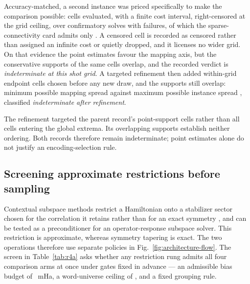 \documentclass[aps,pra,reprint,superscriptaddress,nofootinbib,floatfix,
  showkeys]{revtex4-2}
\begin{document}
Accuracy-matched, a second instance was priced specifically to make the
comparison possible: \cqcRThreeCCells{} cells evaluated, \cqcRThreeCFinite{}
with a finite cost interval, \cqcRThreeCCensored{} right-censored at the grid
ceiling, over \cqcRThreeCSolves{} confirmatory solves with
\cqcRThreeCFailures{} failures, of which the sparse-connectivity card admits
only \cqcRThreeCSCPriced{}.  A censored cell is recorded as censored rather than
assigned an infinite cost or quietly dropped, and it licenses no wider grid.  On
that evidence the point estimates favour the mapping axis, but the conservative
supports of the same cells overlap, and the recorded verdict is
\emph{indeterminate at this shot grid}.  A targeted refinement then added
\cqcRThreeDCells{} within-grid endpoint cells chosen before any new draw, and the
supports still overlap: minimum possible mapping spread
\cqcRThreeDMappingSupport{} against maximum possible instance spread
\cqcRThreeDInstanceSupport{}, classified \emph{indeterminate after refinement}.

The refinement targeted the parent record's point-support cells rather than
all cells entering the global extrema. Its overlapping supports establish
neither ordering. Both records therefore remain indeterminate; point estimates
alone do not justify an encoding-selection rule.

\subsection{Screening approximate restrictions before sampling}

Contextual subspace methods restrict a Hamiltonian onto a stabilizer sector
chosen for the correlation it retains rather than for an exact symmetry
\cite{kirby2021contextual}, and can be tested as a preconditioner for an
operator-response subspace solver. This restriction is approximate, whereas symmetry tapering \cite{bravyi2017tapering} is exact.  The two operations therefore use separate policies in
Fig.~\ref{fig:architecture-flow}.  The
screen in Table~\ref{tab:r4a} asks whether any restriction rung admits all four
comparison arms at once under gates fixed in advance --- an admissible bias
budget of \cqcRFourAAdmissibleBias{}~mHa, a word-universe ceiling of
\cqcRFourACeiling{}, and a fixed grouping rule.
\end{document}
